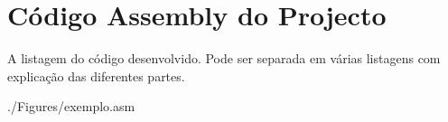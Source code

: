 
\chapter{Código Assembly do Projecto}
\label{chapter:appendixVectors}
A listagem do código desenvolvido. Pode ser separada em várias listagens com explicação das diferentes partes.

\begin{spacing}{0.5}

{./Figures/exemplo.asm}
\end{spacing}



